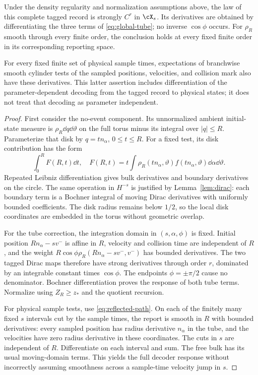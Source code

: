 \begin{theorem}\label{thm:global-response}
Under the density regularity and normalization assumptions above, the law of this complete tagged record is strongly $C^r$ in $\cX_s$. Its derivatives are obtained by differentiating the three terms of \eqref{eq:global-tube}; no inverse $\cos\phi$ occurs. For $\rho_R$ smooth through every finite order, the conclusion holds at every fixed finite order in its corresponding reporting space.

For every fixed finite set of physical sample times, expectations of branchwise smooth cylinder tests of the sampled positions, velocities, and collision mark also have these derivatives. This latter assertion includes differentiation of the parameter-dependent decoding from the tagged record to physical states; it does not treat that decoding as parameter independent.
\end{theorem}
\begin{proof}
First consider the no-event component. Its unnormalized ambient initial-state measure is
$\rho_R\dd q\dd\vartheta$ on the full torus minus its integral over $|q|\le R$. Parameterize that disk by $q=t n_\alpha$, $0\le t\le R$. For a fixed test, its disk contribution has the form
\[
 \int_0^R F(R,t)\dd t,
 \quad F(R,t)=t\int\rho_R(tn_\alpha,\vartheta)f(tn_\alpha,\vartheta)\dd\alpha\dd\vartheta.
\]
Repeated Leibniz differentiation gives bulk derivatives and boundary derivatives on the circle. The same operation in $H^{-s}$ is justified by Lemma~\ref{lem:dirac}: each boundary term is a Bochner integral of moving Dirac derivatives with uniformly bounded coefficients. The disk radius remains below $1/2$, so the local disk coordinates are embedded in the torus without geometric overlap.

For the tube correction, the integration domain in $(s,\alpha,\phi)$ is fixed. Initial position $Rn_\alpha-sv^-$ is affine in $R$, velocity and collision time are independent of $R$, and the weight
$R\cos\phi\rho_R(Rn_\alpha-sv^-,v^-)$ has bounded derivatives. The two tagged Dirac maps therefore have strong derivatives through order $r$, dominated by an integrable constant times $\cos\phi$. The endpoints $\phi=\pm\pi/2$ cause no denominator. Bochner differentiation proves the response of both tube terms. Normalize using $Z_R\ge z_*$ and the quotient recursion.

For physical sample tests, use \eqref{eq:reflected-path}. On each of the finitely many fixed $s$ intervals cut by the sample times, the report is smooth in $R$ with bounded derivatives: every sampled position has radius derivative $n_\alpha$ in the tube, and the velocities have zero radius derivative in these coordinates. The cuts in $s$ are independent of $R$. Differentiate on each interval and sum. The free bulk has its usual moving-domain terms. This yields the full decoder response without incorrectly assuming smoothness across a sample-time velocity jump in $s$.
\end{proof}

